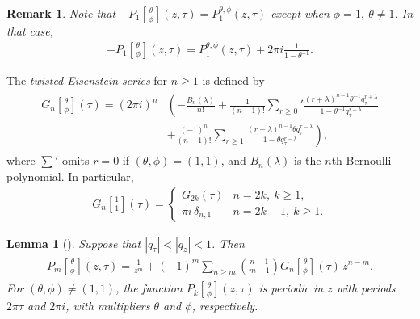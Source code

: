 \documentclass[9pt]{amsart}
\newtheorem{lemma}{Lemma}[section]
\newtheorem{remark}{Remark}[section]
\begin{document}
\begin{remark}\label{pqfunction5}
Note that $-P_{1}\genfrac[]{0pt}{0}{\theta}{\phi}(z,\tau)= P_{1}^{\theta,\phi}(z,\tau)$ except when $\phi=1,\ \theta\neq 1$. In that case,
\begin{align}
  -P_{1}\genfrac[]{0pt}{0}{\theta}{\phi}(z,\tau)= P_{1}^{\theta,\phi}(z,\tau)+2\pi i \frac{1}{1-\theta^{-1}}.
\end{align}
\end{remark}

The {\em twisted Eisenstein series} for $n\geq 1$ is defined by
\begin{align}
    \begin{split}
       G_{n}\genfrac[]{0pt}{0}{\theta}{\phi}(\tau)=(2\pi i )^n &\left( -\frac{B_{n}(\lambda)}{n!} + \frac{1}{(n-1)!} \sum_{r\geq 0}' \frac{(r+\lambda)^{n-1}\theta^{-1}q_{\tau}^{r+\lambda}}{1-\theta^{-1}q_{\tau}^{r+\lambda}} \right. \\
       &\left. + \frac{(-1)^{n}}{(n-1)!} \sum_{r\geq 1} \frac{(r-\lambda)^{n-1}\theta q_{\tau}^{r-\lambda}}{1-\theta q_{\tau}^{r-\lambda}} \right),
    \end{split}
\end{align}
where $\sum'$ omits $r=0$ if $(\theta, \phi)=(1,1)$, and $B_n(\lambda)$ is the $n$th Bernoulli polynomial. In particular,
\begin{align}\label{pqfunction3}
G_{n}\genfrac[]{0pt}{0}{1}{1}(\tau)=\begin{cases}
              G_{2k}(\tau)   & n=2k,\ k\geq 1, \\
              \pi i\,\delta_{n,1} & n=2k-1,\ k\geq 1.
            \end{cases}
\end{align}

\begin{lemma}[\cite{mason2008torus}]\label{Mason}
Suppose that $|q_{\tau}|<|q_{z}|<1$. Then
\begin{align}\label{pqfunction4}
\begin{split}
\displaystyle P_{m}\genfrac[]{0pt}{0}{\theta}{\phi}(z,\tau)=\frac{1}{z^{m}}+(-1)^{m} \sum_{n\geq m} \binom{n-1}{m-1} G_{n}\genfrac[]{0pt}{0}{\theta}{\phi}(\tau)\, z^{n-m}.
\end{split}
\end{align}
For $(\theta,\phi)\neq(1,1)$, the function $P_{k}\genfrac[]{0pt}{0}{\theta}{\phi}(z,\tau)$ is periodic in $z$ with periods $2\pi \tau$ and $2\pi i$, with multipliers $\theta$ and $\phi$, respectively.
\end{lemma}
\end{document}
